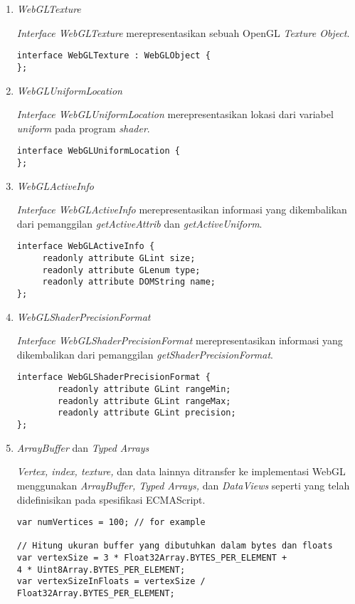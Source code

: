 \begin{enumerate}
\item {\it WebGLTexture}

	{\it Interface WebGLTexture} merepresentasikan sebuah OpenGL {\it Texture Object}.
	\begin{lstlisting}
interface WebGLTexture : WebGLObject {
};
	\end{lstlisting}
	
\item {\it WebGLUniformLocation}

	{\it Interface WebGLUniformLocation} merepresentasikan lokasi dari variabel {\it uniform} pada program {\it shader}.
	\begin{lstlisting}
interface WebGLUniformLocation {
};
	\end{lstlisting}
	
\item {\it WebGLActiveInfo}

	{\it Interface WebGLActiveInfo} merepresentasikan informasi yang dikembalikan dari pemanggilan {\it getActiveAttrib} dan {\it getActiveUniform}.
	\begin{lstlisting}
interface WebGLActiveInfo {
  	 readonly attribute GLint size;
   	 readonly attribute GLenum type;
	 readonly attribute DOMString name;
};
	\end{lstlisting}
	
\item {\it WebGLShaderPrecisionFormat}

	{\it Interface WebGLShaderPrecisionFormat} merepresentasikan informasi yang dikembalikan dari pemanggilan {\it getShaderPrecisionFormat}.
	\begin{lstlisting}
interface WebGLShaderPrecisionFormat {
    	readonly attribute GLint rangeMin;
    	readonly attribute GLint rangeMax;
    	readonly attribute GLint precision;
};
	\end{lstlisting}
	
\item {\it ArrayBuffer} dan {\it Typed Arrays}

	{\it Vertex, index, texture,} dan data lainnya ditransfer ke implementasi WebGL menggunakan {\it ArrayBuffer, Typed Arrays,} dan {\it DataViews} seperti yang telah didefinisikan pada spesifikasi ECMAScript.
\begin{lstlisting}
var numVertices = 100; // for example

// Hitung ukuran buffer yang dibutuhkan dalam bytes dan floats
var vertexSize = 3 * Float32Array.BYTES_PER_ELEMENT +
4 * Uint8Array.BYTES_PER_ELEMENT;
var vertexSizeInFloats = vertexSize / Float32Array.BYTES_PER_ELEMENT;


\end{lstlisting}
\end{enumerate}
